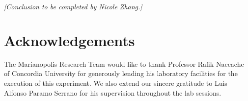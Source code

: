 \documentclass[12pt, a4paper]{article}
\begin{document}
\textit{[Conclusion to be completed by Nicole Zhang.]}

\section*{Acknowledgements}

The Marianopolis Research Team would like to thank Professor Rafik
Naccache of Concordia University for generously lending his laboratory
facilities for the execution of this experiment. We also extend our
sincere gratitude to Luis Alfonso Paramo Serrano for his supervision
throughout the lab sessions.

\printbibliography[title={References}]
\end{document}
